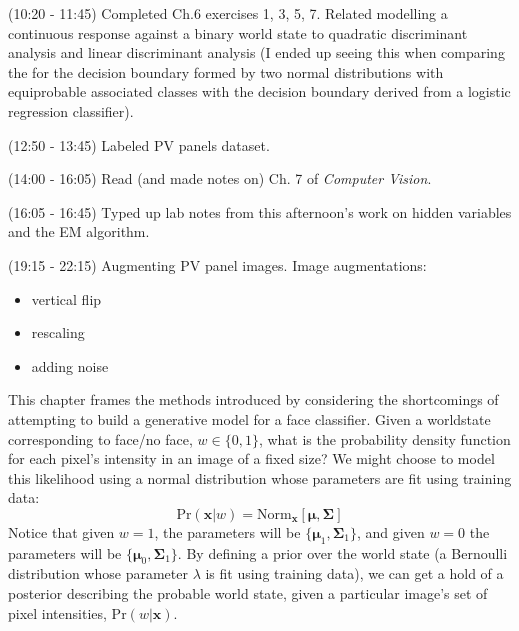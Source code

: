 \documentclass[idxtotoc,hyperref,openany]{labbook} %
\begin{document}
(10:20 - 11:45) Completed Ch.6 exercises 1, 3, 5, 7. Related modelling a continuous response against a binary world state to quadratic discriminant analysis and linear discriminant analysis (I ended up seeing this when comparing the for the decision boundary formed by two normal distributions with equiprobable associated classes with the decision boundary derived from a logistic regression classifier).

(12:50 - 13:45) Labeled PV panels dataset.

(14:00 - 16:05) Read (and made notes on) Ch. 7 of \emph{Computer Vision}.

(16:05 - 16:45) Typed up lab notes from this afternoon's work on hidden variables and the EM algorithm.

(19:15 - 22:15) Augmenting PV panel images. Image augmentations:
\begin{itemize}
	\item vertical flip
	\item rescaling
	\item adding noise
\end{itemize}


This chapter frames the methods introduced by considering the shortcomings of attempting to build a generative model for a face classifier. Given a worldstate corresponding to face/no face, $w \in \{0, 1\}$, what is the probability density function for each pixel's intensity in an image of a fixed size? We might choose to model this likelihood using a normal distribution whose parameters are fit using training data:
\[
	\text{Pr}(\mathbf{x}|w) = \text{Norm}_{\mathbf{x}}[\mathbf{\mu}, \mathbf{\Sigma}]
\]
Notice that given $w = 1$, the parameters will be $\{\mathbf{\mu}_1, \mathbf{\Sigma}_1\}$, and given $w = 0$ the parameters will be $\{\mathbf{\mu}_0, \mathbf{\Sigma}_1\}$. By defining a prior over the world state (a Bernoulli distribution whose parameter $\lambda$ is fit using training data), we can get a hold of a posterior describing the probable world state, given a particular image's set of pixel intensities, $\text{Pr}(w|\mathbf{x})$.
\end{document}
